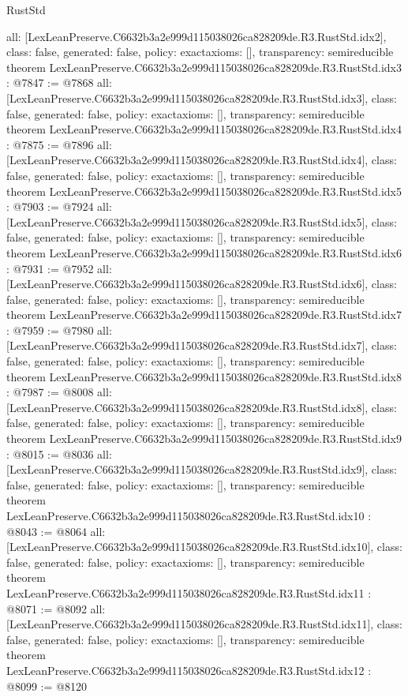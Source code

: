 \begin{lexlean}{RustStd}
\begin{coremodule}
{  all: [LexLeanPreserve.C6632b3a2e999d115038026ca828209de.R3.RustStd.idx2],
  class: false,
  generated: false,
  policy: exact{axioms: []},
  transparency: semireducible
}
theorem LexLeanPreserve.C6632b3a2e999d115038026ca828209de.R3.RustStd.idx3 : @7847 := @7868 {
  all: [LexLeanPreserve.C6632b3a2e999d115038026ca828209de.R3.RustStd.idx3],
  class: false,
  generated: false,
  policy: exact{axioms: []},
  transparency: semireducible
}
theorem LexLeanPreserve.C6632b3a2e999d115038026ca828209de.R3.RustStd.idx4 : @7875 := @7896 {
  all: [LexLeanPreserve.C6632b3a2e999d115038026ca828209de.R3.RustStd.idx4],
  class: false,
  generated: false,
  policy: exact{axioms: []},
  transparency: semireducible
}
theorem LexLeanPreserve.C6632b3a2e999d115038026ca828209de.R3.RustStd.idx5 : @7903 := @7924 {
  all: [LexLeanPreserve.C6632b3a2e999d115038026ca828209de.R3.RustStd.idx5],
  class: false,
  generated: false,
  policy: exact{axioms: []},
  transparency: semireducible
}
theorem LexLeanPreserve.C6632b3a2e999d115038026ca828209de.R3.RustStd.idx6 : @7931 := @7952 {
  all: [LexLeanPreserve.C6632b3a2e999d115038026ca828209de.R3.RustStd.idx6],
  class: false,
  generated: false,
  policy: exact{axioms: []},
  transparency: semireducible
}
theorem LexLeanPreserve.C6632b3a2e999d115038026ca828209de.R3.RustStd.idx7 : @7959 := @7980 {
  all: [LexLeanPreserve.C6632b3a2e999d115038026ca828209de.R3.RustStd.idx7],
  class: false,
  generated: false,
  policy: exact{axioms: []},
  transparency: semireducible
}
theorem LexLeanPreserve.C6632b3a2e999d115038026ca828209de.R3.RustStd.idx8 : @7987 := @8008 {
  all: [LexLeanPreserve.C6632b3a2e999d115038026ca828209de.R3.RustStd.idx8],
  class: false,
  generated: false,
  policy: exact{axioms: []},
  transparency: semireducible
}
theorem LexLeanPreserve.C6632b3a2e999d115038026ca828209de.R3.RustStd.idx9 : @8015 := @8036 {
  all: [LexLeanPreserve.C6632b3a2e999d115038026ca828209de.R3.RustStd.idx9],
  class: false,
  generated: false,
  policy: exact{axioms: []},
  transparency: semireducible
}
theorem LexLeanPreserve.C6632b3a2e999d115038026ca828209de.R3.RustStd.idx10 : @8043 := @8064 {
  all: [LexLeanPreserve.C6632b3a2e999d115038026ca828209de.R3.RustStd.idx10],
  class: false,
  generated: false,
  policy: exact{axioms: []},
  transparency: semireducible
}
theorem LexLeanPreserve.C6632b3a2e999d115038026ca828209de.R3.RustStd.idx11 : @8071 := @8092 {
  all: [LexLeanPreserve.C6632b3a2e999d115038026ca828209de.R3.RustStd.idx11],
  class: false,
  generated: false,
  policy: exact{axioms: []},
  transparency: semireducible
}
theorem LexLeanPreserve.C6632b3a2e999d115038026ca828209de.R3.RustStd.idx12 : @8099 := @8120 {
}
\end{coremodule}
\end{lexlean}
